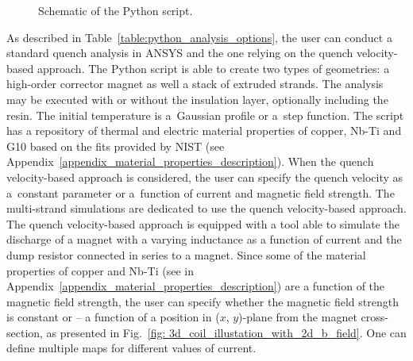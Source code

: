 \begin{figure}[H]
    \caption{Schematic of the Python script.}
    \label{fig:block_diagram_python_architecture}
\end{figure}

As described in Table~\ref{table:python_analysis_options}, the user can conduct a standard quench analysis in ANSYS and the one relying on the quench velocity-based approach. The Python script is able to create two types of geometries: a high-order corrector magnet as well a stack of extruded strands. The analysis may be executed with or without the insulation layer, optionally including the resin. The initial temperature is a~Gaussian profile or a~step function. The script has a repository of thermal and electric material properties of copper, Nb-Ti and G10 based on the fits provided by NIST (see Appendix~\ref{appendix_material_properties_description}). When the quench velocity-based approach is considered, the user can specify the quench velocity as a~constant parameter or a~function of current and magnetic field strength. The multi-strand simulations are dedicated to use the quench velocity-based approach. The quench velocity-based approach is equipped with a tool able to simulate the discharge of a magnet with a varying inductance as a function of current and the dump resistor connected in series to a magnet. Since some of the material properties of copper and Nb-Ti (see in Appendix~\ref{appendix_material_properties_description}) are a function of the magnetic field strength, the user can specify whether the magnetic field strength is constant or -- a function of a position in ($x$, $y$)-plane from the magnet cross-section, as presented in Fig.~\ref{fig: 3d_coil_illustation_with_2d_b_field}. One can define multiple maps for different values of current.

